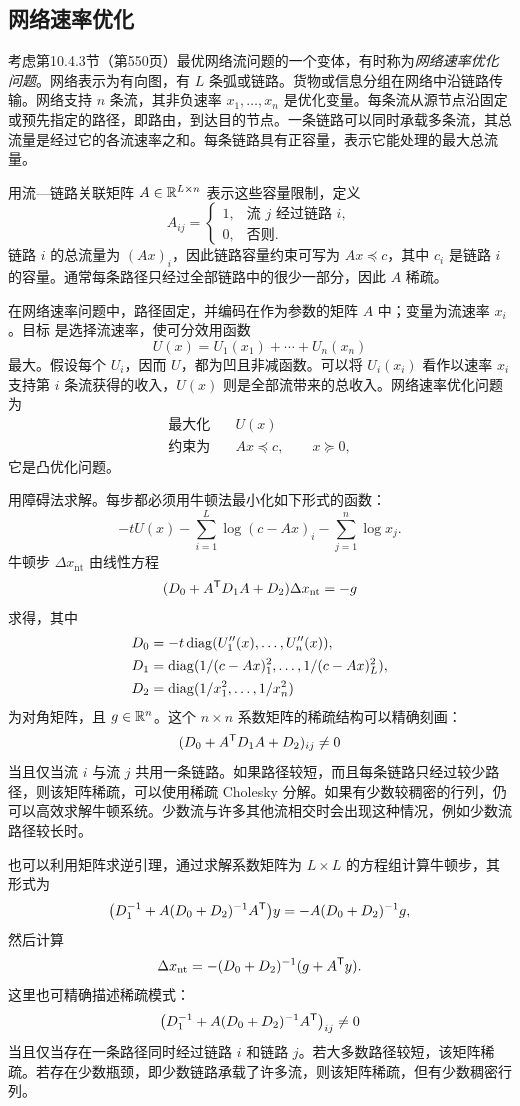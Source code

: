 \subsection{网络速率优化}
考虑第10.4.3节（第550页）最优网络流问题的一个变体，有时称为\emph{网络速率优化问题}。网络表示为有向图，有 $L$ 条弧或链路。货物或信息分组在网络中沿链路传输。网络支持 $n$ 条流，其非负速率 $x_1,\ldots,x_n$ 是优化变量。每条流从源节点沿固定或预先指定的路径，即路由，到达目的节点。一条链路可以同时承载多条流，其总流量是经过它的各流速率之和。每条链路具有正容量，表示它能处理的最大总流量。

用流—链路关联矩阵 $A\in\mathbb R^{L\times n}$ 表示这些容量限制，定义
\[
A_{ij}=\begin{cases}1,&\text{流 $j$ 经过链路 $i$},\\0,&\text{否则}.\end{cases}
\]
链路 $i$ 的总流量为 $(Ax)_i$，因此链路容量约束可写为 $Ax\preceq c$，其中 $c_i$ 是链路 $i$ 的容量。通常每条路径只经过全部链路中的很少一部分，因此 $A$ 稀疏。

在网络速率问题中，路径固定，并编码在作为参数的矩阵 $A$ 中；变量为流速率 $x_i$。目标
是选择流速率，使可分效用函数
\[
U(x)=U_1(x_1)+\cdots+U_n(x_n)
\]
最大。假设每个 $U_i$，因而 $U$，都为凹且非减函数。可以将 $U_i(x_i)$ 看作以速率 $x_i$ 支持第 $i$ 条流获得的收入，$U(x)$ 则是全部流带来的总收入。网络速率优化问题为
\begin{equation}\begin{aligned}
\text{最大化}\quad&U(x)\\\text{约束为}\quad&Ax\preceq c,\qquad x\succeq0,
\end{aligned}\tag{11.62}\end{equation}
它是凸优化问题。

用障碍法求解。每步都必须用牛顿法最小化如下形式的函数：
\[
-tU(x)-\sum_{i=1}^L\log(c-Ax)_i-\sum_{j=1}^n\log x_j.
\]
牛顿步 $\Delta x_{\mathrm{nt}}$ 由线性方程
\[
(D_0+A^\mathsf T D_1A+D_2)\Delta x_{\mathrm{nt}}=-g
\]
求得，其中
\begin{align*}
D_0&=-t\operatorname{diag}(U_1''(x),\ldots,U_n''(x)),\\
D_1&=\operatorname{diag}(1/(c-Ax)_1^2,\ldots,1/(c-Ax)_L^2),\\
D_2&=\operatorname{diag}(1/x_1^2,\ldots,1/x_n^2)
\end{align*}
为对角矩阵，且 $g\in\mathbb R^n$。这个 $n\times n$ 系数矩阵的稀疏结构可以精确刻画：
\[
(D_0+A^\mathsf T D_1A+D_2)_{ij}\ne0
\]
当且仅当流 $i$ 与流 $j$ 共用一条链路。如果路径较短，而且每条链路只经过较少路径，则该矩阵稀疏，可以使用稀疏 Cholesky 分解。如果有少数较稠密的行列，仍可以高效求解牛顿系统。少数流与许多其他流相交时会出现这种情况，例如少数流路径较长时。

也可以利用矩阵求逆引理，通过求解系数矩阵为 $L\times L$ 的方程组计算牛顿步，其形式为
\[
\bigl(D_1^{-1}+A(D_0+D_2)^{-1}A^\mathsf T\bigr)y=-A(D_0+D_2)^{-1}g,
\]
然后计算
\[
\Delta x_{\mathrm{nt}}=-(D_0+D_2)^{-1}(g+A^\mathsf T y).
\]
这里也可精确描述稀疏模式：
\[
\bigl(D_1^{-1}+A(D_0+D_2)^{-1}A^\mathsf T\bigr)_{ij}\ne0
\]
当且仅当存在一条路径同时经过链路 $i$ 和链路 $j$。若大多数路径较短，该矩阵稀疏。若存在少数瓶颈，即少数链路承载了许多流，则该矩阵稀疏，但有少数稠密行列。
